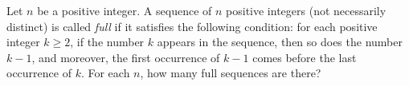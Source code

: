 Let $n$ be a positive integer. A sequence of $n$ positive integers (not necessarily distinct) is called \emph{full} if it satisfies the following condition: for each positive integer $k \geq 2$, if the number $k$ appears in the sequence, then so does the number $k-1$, and moreover, the first occurrence of $k-1$ comes before the last occurrence of $k$. For each $n$, how many full sequences are there?
